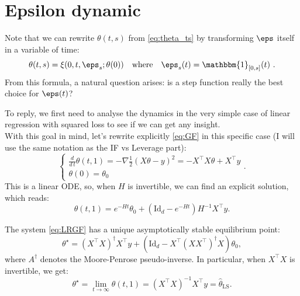 \section{Epsilon dynamic}
Note that we can rewrite $\theta(t,s)$ from \ref{eq:theta_ts} by transforming $\eps$ itself in a variable of time:
\begin{equation*}
  \theta(t,s)=\xi(0,t,\eps_s;\theta(0))~~ \text{ where }~~ 
  \eps_s(t)= \mathbbm{1}_{[0,s]}(t)\ .
\end{equation*}
From this formula, a natural question arises: is a step function really the best choice for $\eps(t)$?

To reply, we first need to analyse the dynamics in the very simple case of linear regression with squared loss to see if we can get any insight.\\
With this goal in mind, let's rewrite explicitly \ref{eq:GF} in this specific case (I will use the same notation as the IF vs Leverage part):
\begin{equation}\label{eq:LRGF}\tag{LRGF}
  \begin{cases}
    \frac{d}{d\,t}\theta(t,1) = -\nabla \frac12(X\theta-y)^2=-X^\top X\theta+X^\top y \\
    \theta(0)=\theta_0
  \end{cases}.
\end{equation}
This is a linear ODE, so, when $H$ is invertible, we can find an explicit solution, which reads:
\begin{equation}\label{eq:sol_theta}
  \theta(t,1)=e^{-H t} \theta_0 +(\mathrm{Id}_d-e^{-H t})H^{-1}X^\top y .
\end{equation}

\begin{lemma}
  The system \ref{eq:LRGF} has a unique asymptotically stable equilibrium point:
  \begin{equation*}
    \theta^\star=(X^\top X)^\dagger X^\top y + (\mathrm{Id}_d - X^\top (X X^\top)^\dagger X)\theta_0 ,
  \end{equation*}
  where $A^\dagger$ denotes the Moore-Penrose pseudo-inverse.
  In particular, when $X^\top X$ is invertible, we get:
  $$\theta^\star=\lim_{t\to\infty}\theta(t,1)=(X^\top X)^{-1} X^\top y =\hat\theta_{\mathrm{LS}}.$$
\end{lemma}

